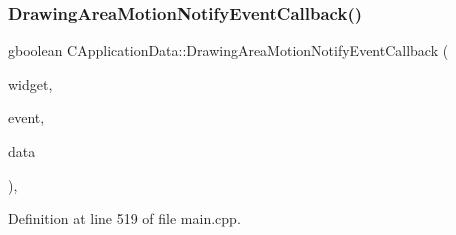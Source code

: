 \subsubsection{\texorpdfstring{Drawing\+Area\+Motion\+Notify\+Event\+Callback()}{DrawingAreaMotionNotifyEventCallback()}}
{\footnotesize\ttfamily gboolean C\+Application\+Data\+::\+Drawing\+Area\+Motion\+Notify\+Event\+Callback (\begin{DoxyParamCaption}\item[{Gtk\+Widget $\ast$}]{widget,  }\item[{Gdk\+Event\+Motion $\ast$}]{event,  }\item[{gpointer}]{data }\end{DoxyParamCaption})\hspace{0.3cm}{\ttfamily [static]}, {\ttfamily [protected]}}



Definition at line 519 of file main.\+cpp.



